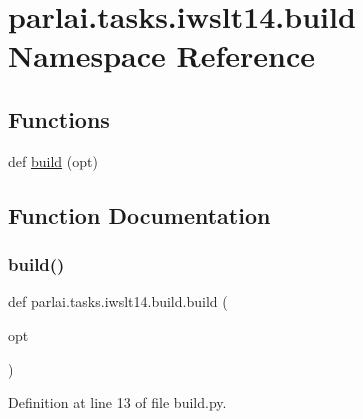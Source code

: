 \hypertarget{namespaceparlai_1_1tasks_1_1iwslt14_1_1build}{}\section{parlai.\+tasks.\+iwslt14.\+build Namespace Reference}
\label{namespaceparlai_1_1tasks_1_1iwslt14_1_1build}
\subsection*{Functions}
\begin{DoxyCompactItemize}
\item 
def \hyperlink{namespaceparlai_1_1tasks_1_1iwslt14_1_1build_a88091774178185753ae29ddad310f0ec}{build} (opt)
\end{DoxyCompactItemize}


\subsection{Function Documentation}
\mbox{\label{namespaceparlai_1_1tasks_1_1iwslt14_1_1build_a88091774178185753ae29ddad310f0ec}} 
\subsubsection{\texorpdfstring{build()}{build()}}
{\footnotesize\ttfamily def parlai.\+tasks.\+iwslt14.\+build.\+build (\begin{DoxyParamCaption}\item[{}]{opt }\end{DoxyParamCaption})}



Definition at line 13 of file build.\+py.

